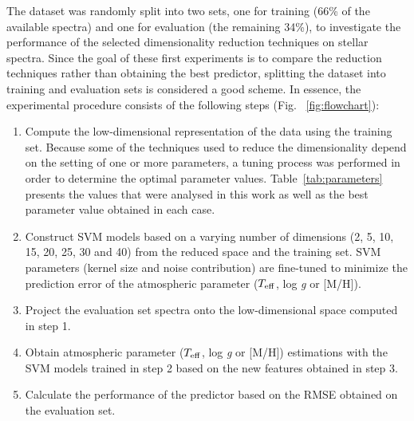 \documentclass[a4paper,fleqn,usenatbib]{mnras}
\begin{document}
The dataset was randomly split into two sets, one for training
  (66\% of the available spectra) and one for evaluation (the
  remaining 34\%), to investigate the performance of the selected
  dimensionality reduction techniques on stellar spectra. Since the
goal of these first experiments is to compare the reduction techniques
rather than obtaining the best predictor, splitting the dataset into
training and evaluation sets is considered a good scheme. In essence,
the experimental procedure consists of the following steps (Fig.~
\ref{fig:flowchart}):

\begin{enumerate}
\item Compute the low-dimensional representation of the data using the
  training set. Because some of the techniques used to reduce the 
  dimensionality depend on the setting of one or more parameters, 
  a tuning process was performed in order to determine the optimal 
  parameter values. Table~\ref{tab:parameters} presents the values 
  that were analysed in this work as well as the best parameter value 
  obtained in each case.
\item Construct SVM models based on a varying number of dimensions (2,
  5, 10, 15, 20, 25, 30 and 40) from the reduced space and the
    training set. SVM parameters (kernel size and noise contribution)
    are fine-tuned to minimize the prediction error of the 
    atmospheric parameter ($T_{\rm eff}$, log \textit{g} or [M/H]).
\item Project the evaluation set spectra onto the
  low-dimensional space computed in step 1.
\item Obtain atmospheric parameter ($T_{\rm eff}$, 
  log \textit{g} or [M/H]) estimations with the SVM models trained in step
  2 based on the new features obtained in step 3.
\item Calculate the performance of the predictor based on the RMSE
  obtained on the evaluation set.
\end{enumerate}
\end{document}
